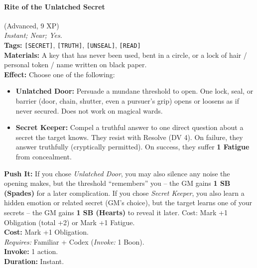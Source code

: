 \paragraph{Rite of the Unlatched Secret} (Advanced, 9 XP) \hfill \\
\emph{Instant; Near; Yes.} \\
\textbf{Tags:} \texttt{[SECRET]}, \texttt{[TRUTH]}, \texttt{[UNSEAL]}, \texttt{[READ]} \\
\textbf{Materials:} A key that has never been used, bent in a circle, or a lock of hair / personal token / name written on black paper. \\
\textbf{Effect:} Choose one of the following:
\begin{itemize}
  \item \textbf{Unlatched Door:} Persuade a mundane threshold to open. One lock, seal, or barrier (door, chain, shutter, even a pursuer's grip) opens or loosens as if never secured. Does not work on magical wards.
  \item \textbf{Secret Keeper:} Compel a truthful answer to one direct question about a secret the target knows. They resist with Resolve (DV 4). On failure, they answer truthfully (cryptically permitted). On success, they suffer \textbf{1 Fatigue} from concealment.
\end{itemize}
\textbf{Push It:} If you chose \textit{Unlatched Door}, you may also silence any noise the opening makes, but the threshold ``remembers'' you -- the GM gains \textbf{1 SB (Spades)} for a later complication. If you chose \textit{Secret Keeper}, you also learn a hidden emotion or related secret (GM's choice), but the target learns one of your secrets -- the GM gains \textbf{1 SB (Hearts)} to reveal it later. Cost: Mark +1 Obligation (total +2) or Mark +1 Fatigue. \\
\textbf{Cost:} Mark +1 Obligation. \\
\textit{Requires:} Familiar + Codex (\textit{Invoke:} 1 Boon). \\
\textbf{Invoke:} 1 action. \\
\textbf{Duration:} Instant.

